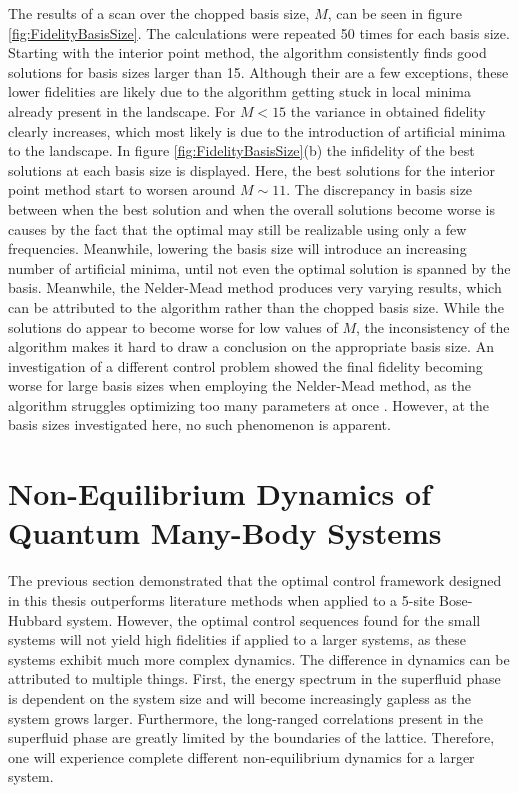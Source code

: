 The results of a scan over the chopped basis size, $M$, can be seen in figure \ref{fig:FidelityBasisSize}. The calculations were repeated 50 times for each basis size. Starting with the interior point method, the algorithm consistently finds good solutions for basis sizes larger than 15. Although their are a few exceptions, these lower fidelities are likely due to the algorithm getting stuck in local minima already present in the landscape. For $M < 15$ the variance in obtained fidelity clearly increases, which most likely is due to the introduction of artificial minima to the landscape. In figure \ref{fig:FidelityBasisSize}(b) the infidelity of the best solutions at each basis size is displayed. Here, the best solutions for the interior point method start to worsen around $M \sim 11$. The discrepancy in basis size between when the best solution and when the overall solutions become worse is causes by the fact that the optimal may still be realizable using only a few frequencies. Meanwhile, lowering the basis size will introduce an increasing number of artificial minima, until not even the optimal solution is spanned by the basis.
Meanwhile, the Nelder-Mead method produces very varying results, which can be attributed to the algorithm rather than the chopped basis size. While the solutions do appear to become worse for low values of $M$, the inconsistency of the algorithm makes it hard to draw a conclusion on the appropriate basis size. An investigation of a different control problem showed the final fidelity becoming worse for large basis sizes when employing the Nelder-Mead method, as the algorithm struggles optimizing too many parameters at once \cite{sorensen2018}. However, at the basis sizes investigated here, no such phenomenon is apparent.


\section{Non-Equilibrium Dynamics of Quantum Many-Body Systems}
The previous section demonstrated that the optimal control framework designed in this thesis outperforms literature methods when applied to a 5-site Bose-Hubbard system. However, the optimal control sequences found for the small systems will not yield high fidelities if applied to a larger systems, as these systems exhibit much more complex dynamics. The difference in dynamics can be attributed to multiple things. First, the energy spectrum in the superfluid phase is dependent on the system size and will become increasingly gapless as the system grows larger. Furthermore, the long-ranged correlations present in the superfluid phase are greatly limited by the boundaries of the lattice. Therefore, one will experience complete different non-equilibrium dynamics for a larger system.\\
 
